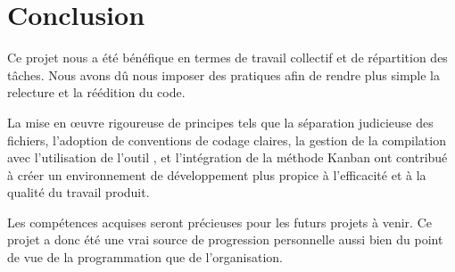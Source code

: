 \section*{Conclusion}

Ce projet nous a été bénéfique en termes de travail collectif et de répartition des tâches. Nous avons dû nous imposer des pratiques afin de rendre plus simple la relecture et la réédition du code. 

La mise en œuvre rigoureuse de principes tels que la séparation judicieuse des fichiers, l'adoption de conventions de codage claires, la gestion de la compilation avec l'utilisation de l'outil , et l'intégration de la méthode Kanban ont contribué à créer un environnement de développement plus propice à l'efficacité et à la qualité du travail produit.

Les compétences acquises seront précieuses pour les futurs projets à venir. Ce projet a donc été une vrai source de progression personnelle aussi bien du point de vue de la programmation que de l'organisation.